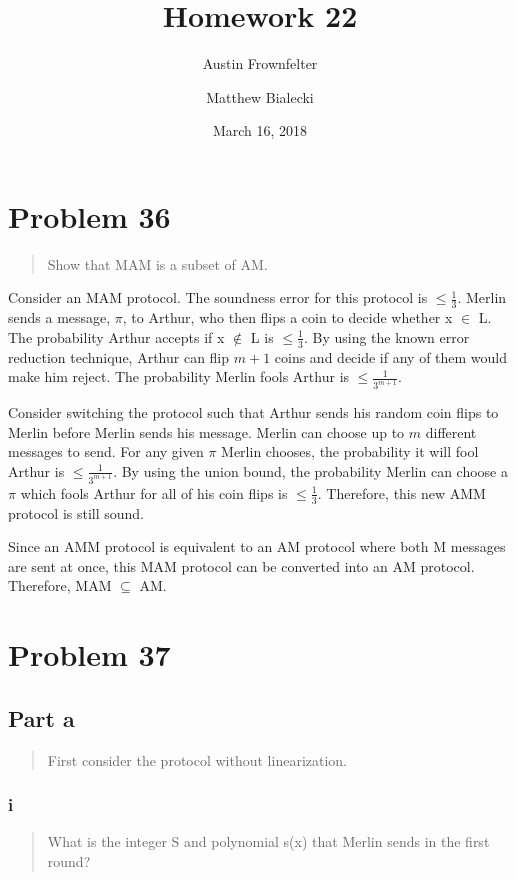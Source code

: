 \documentclass{article}
\title{Homework 22}
\author{Austin Frownfelter \and Matthew Bialecki}
\date{March 16, 2018}
\begin{document}
\maketitle

\section{Problem 36}
\begin{quote}
Show that MAM is a subset of AM.
\end{quote}

Consider an MAM protocol.  The soundness error for this protocol is $\leq \frac13$.  Merlin sends a message, $\pi$, to Arthur, who then flips a coin to decide whether x $\in$ L.  The probability Arthur accepts if x $\notin$ L is $\leq \frac13$.  By using the known error reduction technique, Arthur can flip $m+1$ coins and decide if any of them would make him reject.  The probability Merlin fools Arthur is $\leq \frac1{3^{m+1}}$.

Consider switching the protocol such that Arthur sends his random coin flips to Merlin before Merlin sends his message.  Merlin can choose up to $m$ different messages to send.  For any given $\pi$ Merlin chooses, the probability it will fool Arthur is $\leq \frac1{3^{m+1}}$.  By using the union bound, the probability Merlin can choose a $\pi$ which fools Arthur for all of his coin flips is $\leq \frac13$.  Therefore, this new AMM protocol is still sound.

Since an AMM protocol is equivalent to an AM protocol where both M messages are sent at once, this MAM protocol can be converted into an AM protocol.  Therefore, MAM $\subseteq$ AM.


\section{Problem 37}

\subsection{Part a}
\begin{quote}
First consider the protocol without linearization.
\end{quote}

\subsubsection{i}
\begin{quote}
What is the integer S and polynomial s(x) that  Merlin  sends  in  the  first round?
\end{quote}
\end{document}
